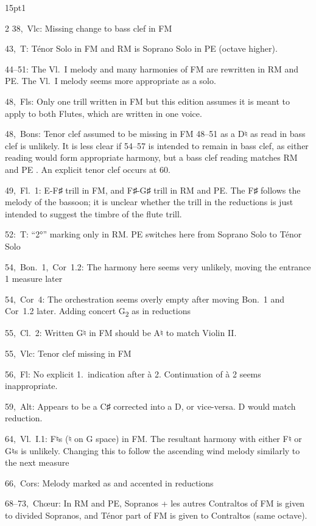 \documentclass[twoside]{article}
\newcommand\dynmark[1]{\scalebox{0.9}{#1}{\kern1pt}}
\begin{document}
\begin{hangparas}{15pt}{1}
\begin{multicols}{2}
\mbox{38, Vlc}: Missing change to bass clef in FM

\mbox{43, T}: Ténor Solo in FM and RM is Soprano Solo in PE (octave higher).

\mbox{44--51}: The \mbox{Vl.~I} melody and many harmonies of FM are rewritten in RM and PE. The \mbox{Vl.~I} melody seems more appropriate as a solo.

\mbox{48, Fls}: Only one trill written in FM but this edition assumes it is meant to apply to both Flutes, which are written in one voice.

\mbox{48, Bons}: Tenor clef assumed to be missing in FM 48--51 as a D♮ as read in bass clef is unlikely. It is less clear if 54--57 is intended to remain in bass clef, as either reading would form appropriate harmony, but a bass clef reading matches RM and PE . An explicit tenor clef occurs at 60.

\mbox{49, Fl.~1}: E-F♯ trill in FM, and F♯-G♯ trill in RM and PE. The F♯ follows the melody of the bassoon; it is unclear whether the trill in the reductions is just intended to suggest the timbre of the flute trill.

\mbox{52}:\mbox{ T}: ``2°'' marking only in RM. PE switches here from Soprano Solo to Ténor Solo

\mbox{54, Bon.~1, Cor 1.2}: The harmony here seems very unlikely, moving the entrance 1 measure later

\mbox{54, Cor 4}: The orchestration seems overly empty after moving Bon.~1 and Cor~1.2 later. Adding concert G\textsubscript{2} as in reductions

\mbox{55, Cl.~2}: Written G♮ in FM should be A♮ to match Violin II.

\mbox{55, Vlc}: Tenor clef missing in FM

\mbox{56, Fl}: No explicit 1.\ indication after à 2. Continuation of à 2 seems inappropriate.

\mbox{59, Alt}: Appears to be a C♯ corrected into a D, or vice-versa. D would match reduction.

\mbox{64, Vl.~I.1}: F♮s (♮ on G space) in FM. The resultant harmony with either F♮ or G♮s is unlikely. Changing this to follow the ascending wind melody similarly to the next measure

\mbox{66, Cors}: Melody marked as \dynmark{\mf} and accented in reductions

\mbox{68--73, Chœur}: In RM and PE, Sopranos + les autres Contraltos of FM is given to divided Sopranos, and Ténor part of FM is given to Contraltos (same octave).


\end{multicols}
\end{hangparas}
\end{document}
